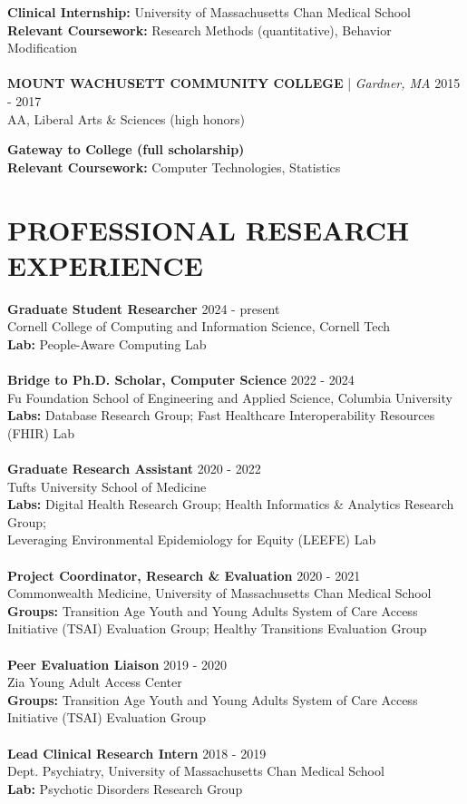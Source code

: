 \documentclass[a4paper,12pt]{article}
\begin{document}
\small{\textbf{Clinical Internship:} University of Massachusetts Chan Medical School}\\
\small{\textbf{Relevant Coursework:} Research Methods (quantitative), Behavior Modification}\\
\\
\textbf{MOUNT WACHUSETT COMMUNITY COLLEGE} | \textit{Gardner, MA} \hfill 2015 - 2017\\
AA, Liberal Arts \& Sciences (high honors) \\
\small{\textbf{Gateway to College (full scholarship)}\\
\small{\textbf{Relevant Coursework:} Computer Technologies, Statistics}\\

\section*{PROFESSIONAL RESEARCH EXPERIENCE}
\textbf{Graduate Student Researcher} \hfill 2024 - present\\
Cornell College of Computing and Information Science, Cornell Tech \\
\textbf{Lab:} People-Aware Computing Lab \\
\\
\textbf{Bridge to Ph.D. Scholar, Computer Science} \hfill 2022 - 2024\\
Fu Foundation School of Engineering and Applied Science, Columbia University \\
\textbf{Labs:} Database Research Group; Fast Healthcare Interoperability Resources (FHIR) Lab \\
\\
\textbf{Graduate Research Assistant} \hfill 2020 - 2022\\
Tufts University School of Medicine \\
\textbf{Labs:} Digital Health Research Group; Health Informatics \& Analytics Research Group; \\Leveraging Environmental Epidemiology for Equity (LEEFE) Lab \\
\\
\textbf{Project Coordinator, Research \& Evaluation} \hfill 2020 - 2021\\
Commonwealth Medicine, University of Massachusetts Chan Medical School \\
\textbf{Groups:} Transition Age Youth and Young Adults System of Care Access Initiative (TSAI) Evaluation Group; Healthy Transitions Evaluation Group \\
\\
\textbf{Peer Evaluation Liaison} \hfill 2019 - 2020\\
Zia Young Adult Access Center \\
\textbf{Groups:} Transition Age Youth and Young Adults System of Care Access Initiative (TSAI) Evaluation Group \\
\\
\textbf{Lead Clinical Research Intern} \hfill 2018 - 2019\\
Dept. Psychiatry, University of Massachusetts Chan Medical School \\
\textbf{Lab:} Psychotic Disorders Research Group \
}
\end{document}
